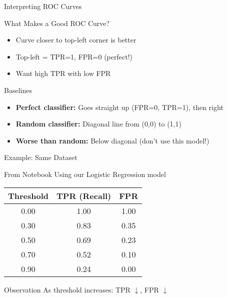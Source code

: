 \documentclass{beamer}
\begin{document}
\begin{frame}{Interpreting ROC Curves}
\begin{keypointsbox}{What Makes a Good ROC Curve?}
\begin{itemize}
    \item Curve closer to top-left corner is better
    \item Top-left = TPR=1, FPR=0 (perfect!)
    \item Want high TPR with low FPR
\end{itemize}
\end{keypointsbox}

\vspace{0.3cm}

\begin{block}{Baselines}
\begin{itemize}
    \item \textbf{Perfect classifier:}
    Goes straight up (FPR=0, TPR=1), then right

    \item \textbf{Random classifier:}
    Diagonal line from (0,0) to (1,1)

    \item \textbf{Worse than random:}
    Below diagonal (don't use this model!)
\end{itemize}
\end{block}
\end{frame}

\begin{frame}{Example: Same Dataset}
\begin{examplebox}{From Notebook}
Using our Logistic Regression model
\end{examplebox}

\vspace{0.3cm}

\begin{center}
\small
\begin{tabular}{|c|c|c|}
\hline
\textbf{Threshold} & \textbf{TPR (Recall)} & \textbf{FPR} \\
\hline
0.00 & 1.00 & 1.00 \\
\hline
0.30 & 0.83 & 0.35 \\
\hline
0.50 & 0.69 & 0.23 \\
\hline
0.70 & 0.52 & 0.10 \\
\hline
0.90 & 0.24 & 0.00 \\
\hline
\end{tabular}
\end{center}

\vspace{0.3cm}

\begin{keypointsbox}{Observation}
As threshold increases: TPR $\downarrow$, FPR $\downarrow$
\end{keypointsbox}
\end{frame}
\end{document}
